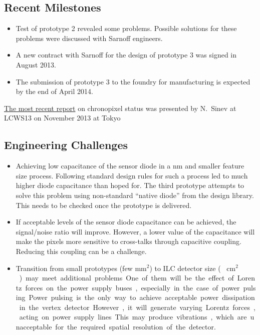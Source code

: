 \subsection{Recent Milestones}
\begin{itemize}
    \item Test of prototype 2 revealed some problems. Possible solutions for these problems were discussed with Sarnoff engineers.  
    \item A new contract with Sarnoff for the design of prototype 3 was signed in August 2013.
    \item The submission of prototype 3 to the foundry for manufacturing is expected by the end of April 2014.
\end{itemize}
\href{https://agenda.linearcollider.org/getFile.py/access?contribId=309&sessionId=37&resId=1&materialId=slides&confId=6000}{The most recent report} on chronopixel status was presented by N.~Sinev at LCWS13 on November 2013 at Tokyo 

\subsection{Engineering Challenges}
\begin{itemize}
    \item Achieving low capacitance of the sensor diode in a \unit[65]{nm} and smaller feature size process. Following standard design rules for such a process led to much higher diode capacitance than hoped for. The third prototype attempts to solve this problem using non-standard ``native diode'' from the design library. This needs to be checked once the prototype is delivered.
    \item If acceptable levels of the sensor diode capacitance can be achieved, the signal/noise ratio will improve. However, a lower value of the capacitance will make the pixels more sensitive to cross-talks through capacitive coupling. Reducing this coupling can be a challenge.
    \item Transition from small prototypes (few $\text{mm}^{2}$) to ILC detector size (~ \unit[10]{$\text{cm}^2$}) may meet additional problems. One of them will be the effect of Lorentz forces on the power supply buses, especially in the case of power pulsing. Power pulsing is the only way to achieve acceptable power dissipation in the vertex detector. However, it will generate varying Lorentz forces, acting on power supply lines. This may produce vibrations, which are unacceptable for the required spatial resolution of the detector.
\end{itemize}

